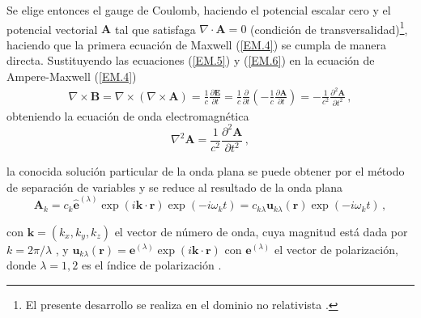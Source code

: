 Se elige entonces el gauge de Coulomb, haciendo el potencial escalar cero y el potencial vectorial $\mathbf{A}$ tal que satisfaga $\nabla \cdot \mathbf{A} = 0$ (condición de transversalidad)\footnote{El presente desarrollo se realiza en el dominio no relativista \cite{Agarwal_2012}.}, haciendo que la primera ecuación de Maxwell (\ref{EM.4}) se cumpla de manera directa. Sustituyendo las ecuaciones (\ref{EM.5}) y (\ref{EM.6}) 
en la ecuaci\'on de Ampere-Maxwell (\ref{EM.4}) 
\begin{align}
\label{EM.7}
\nabla \times \mathbf{B} = \nabla \times \left(\nabla\times\mathbf{A}\right) 
=\frac{1}{c}\frac{\partial \mathbf{E}}{\partial t} = \frac{1}{c}\frac{\partial}{\partial t} \left(-\frac{1}{c}\frac{\partial\mathbf{A}}{\partial t}\right) = -\frac{1}{c^{2}}\frac{\partial^{2}\mathbf{A}}{\partial t^{2}} \,,
\end{align}
obteniendo la ecuación de onda electromagnética
\begin{equation}
\label{EM.8}
\nabla^2 \mathbf{A} = \frac{1}{c^2} \frac{\partial^2 \mathbf{A}}{\partial t^2}\,,
\end{equation}

la conocida solución particular de la onda plana se puede obtener por el método de separación de variables y se reduce al resultado de la onda plana
\begin{equation}
\label{EM.9}
\mathbf{A}_k = c_k \mathbf{\hat{e}}^{(\lambda)}\exp{(i\mathbf{k}\cdot \mathbf{r})}\exp{(-i\omega_k t)} = c_{k\lambda}\mathbf{u}_{k\lambda}(\mathbf{r}) \exp{(-i\omega_k t)} \,,
\end{equation}

con $\mathbf{k} = (k_x, k_y, k_z)$ el vector de número de onda, cuya magnitud está dada por $k = 2\pi/\lambda$ \cite{Riley}, y $\mathbf{u}_{k\lambda}(\mathbf{r}) = \mathbf{e}^{(\lambda)} \exp{(i\mathbf{k}\cdot \mathbf{r})}$ con $\mathbf{e}^{(\lambda)}$ el vector de polarización, donde $\lambda=1,2$ es el índice de polarización \cite{Walls}.

